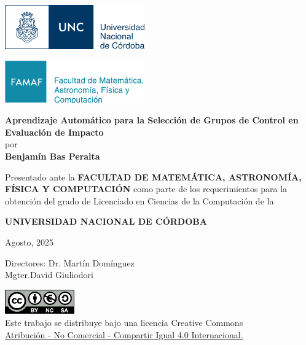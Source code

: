 \begin{titlepage}
\begin{center}

    \noindent
    \begin{minipage}[t]{0.5\linewidth}
        \flushleft
        \includegraphics[width=6cm]{logos/unc.png}
    \end{minipage}%
    \begin{minipage}[t]{0.5\linewidth}
        \flushright
        \includegraphics[width=6cm]{logos/famaf.png}
    \end{minipage}

    \vspace{2cm}

    {\LARGE \textbf{Aprendizaje Automático para la Selección de Grupos de Control en
    Evaluación de Impacto}}
    \\[1cm]
    {\large por}
    \\[0.5cm]
    {\Large \textbf{Benjamín Bas Peralta}}

    \vspace{1cm}

    \noindent
    Presentado ante la \textbf{FACULTAD DE MATEMÁTICA, ASTRONOMÍA, FÍSICA Y COMPUTACIÓN}
    como parte de los requerimientos para la obtención del grado de Licenciado en Ciencias
    de la Computación de la

    \textbf{UNIVERSIDAD NACIONAL DE CÓRDOBA}

    \vspace{0.5cm}

    Agosto, 2025

    \vspace{0.5cm}

    Directores: Dr. Martín Domínguez \\ Mgter.David Giuliodori

    \vfill

    \includegraphics[width=3cm]{logos/creative-commons.png} \\
    \vspace{0.3cm}
    Este trabajo se distribuye bajo una licencia Creative Commons \\
    \href{https://creativecommons.org/licenses/by-nc-sa/4.0/deed.es}{
        Atribución - No Comercial - Compartir Igual 4.0 Internacional.
    }
\end{center}
\end{titlepage}
